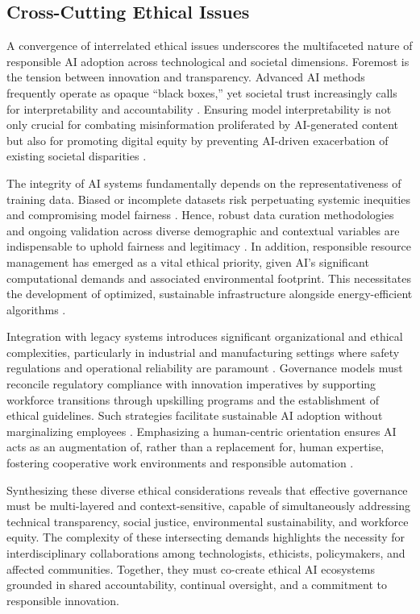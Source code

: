\documentclass[sigconf]{acmart}
\begin{document}
\subsection{Cross-Cutting Ethical Issues}

A convergence of interrelated ethical issues underscores the multifaceted nature of responsible AI adoption across technological and societal dimensions. Foremost is the tension between innovation and transparency. Advanced AI methods frequently operate as opaque “black boxes,” yet societal trust increasingly calls for interpretability and accountability \cite{ref7,ref8}. Ensuring model interpretability is not only crucial for combating misinformation proliferated by AI-generated content but also for promoting digital equity by preventing AI-driven exacerbation of existing societal disparities \cite{ref6,ref17}.

The integrity of AI systems fundamentally depends on the representativeness of training data. Biased or incomplete datasets risk perpetuating systemic inequities and compromising model fairness \cite{ref37}. Hence, robust data curation methodologies and ongoing validation across diverse demographic and contextual variables are indispensable to uphold fairness and legitimacy \cite{ref20}. In addition, responsible resource management has emerged as a vital ethical priority, given AI’s significant computational demands and associated environmental footprint. This necessitates the development of optimized, sustainable infrastructure alongside energy-efficient algorithms \cite{ref19}.

Integration with legacy systems introduces significant organizational and ethical complexities, particularly in industrial and manufacturing settings where safety regulations and operational reliability are paramount \cite{ref38}. Governance models must reconcile regulatory compliance with innovation imperatives by supporting workforce transitions through upskilling programs and the establishment of ethical guidelines. Such strategies facilitate sustainable AI adoption without marginalizing employees \cite{ref11,ref12}. Emphasizing a human-centric orientation ensures AI acts as an augmentation of, rather than a replacement for, human expertise, fostering cooperative work environments and responsible automation \cite{ref2}.

Synthesizing these diverse ethical considerations reveals that effective governance must be multi-layered and context-sensitive, capable of simultaneously addressing technical transparency, social justice, environmental sustainability, and workforce equity. The complexity of these intersecting demands highlights the necessity for interdisciplinary collaborations among technologists, ethicists, policymakers, and affected communities. Together, they must co-create ethical AI ecosystems grounded in shared accountability, continual oversight, and a commitment to responsible innovation.
\end{document}
